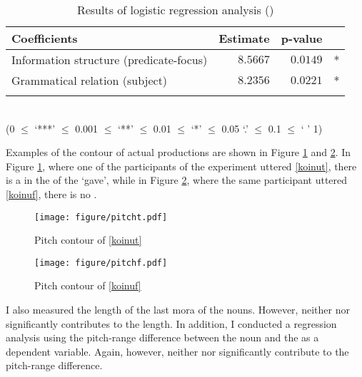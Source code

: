 \begin{table}
\centering
\caption{Results of logistic regression analysis ()}
\begin{tabular}{lrrr}
\lsptoprule
Coefficients  & Estimate & p-value & \\
\midrule
 Information structure (predicate-focus)    & $8.5667$   & $0.0149$  & *  \\
 Grammatical relation (subject)     & $8.2356$   & $0.0221$  & *  \\
\lspbottomrule
\end{tabular} \\
\hfill{(0 $\le$ `***' $\le$ 0.001 $\le$ `**' $\le$ 0.01 $\le$ `*' $\le$ 0.05 `.' $\le$ 0.1 $\le$ ` ' 1)}
\label{Pitchv2v1GlmT}
\end{table}

Examples of the  contour of actual productions are shown
in Figure \ref{Int:Fig:koinut} and \ref{Int:Fig:koinuf}.
In Figure \ref{Int:Fig:koinut},
where one of the participants of the experiment uttered \ref{koinut},
there is a  in the  of the   `gave',
while in Figure \ref{Int:Fig:koinuf},
where the same participant uttered \ref{koinuf},
there is no .

\begin{figure}
	\begin{center}
		\texttt{[image: figure/pitcht.pdf]}
	\end{center}
	\caption{Pitch contour of \ref{koinut}}
	\label{Int:Fig:koinut}
\end{figure}
\begin{figure}
	\begin{center}
		\texttt{[image: figure/pitchf.pdf]}
	\end{center}
	\caption{Pitch contour of \ref{koinuf}}
	\label{Int:Fig:koinuf}
\end{figure}

I also measured the  length of the last mora of the nouns.
However, neither  nor  significantly contributes to the  length.
In addition, I conducted a regression analysis
using the pitch-range difference between the noun and the  as a dependent variable.
Again, however,
neither  nor  significantly contribute to the pitch-range difference.


